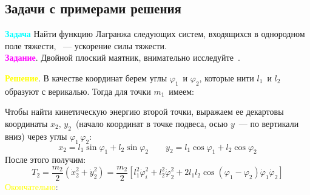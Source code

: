 \newpage	%

\subsection{Задачи с  примерами решения}
{\color{white}
\noindent
\textcolor{cyan}{\textbf{Задача}}
Найти функцию Лагранжа следующих систем, входящихся в однородном поле
тяжести, \textg\, --- ускорение силы тяжести.\\[5pt]
\noindent
\textcolor{magenta}{\textbf{Задание}}. Двойной плоский маятник,
внимательно исследуйте~.


\noindent
\textcolor{yellow}{\textbf{Решение}}. В качестве координат берем углы $\varphi_1$\, и $\varphi_2$,
которые нити $l_1$\, и $l_2$\, образуют с верикалью. Тогда для точки
$m_1$\, имеем:

\begin{center}
\end{center}

Чтобы найти кинетическую энергию второй точки, выражаем ее декартовы
координаты $x_2,\, y_2$\, (начало координат в точке подвеса, осью $y$\,
--- по вертикали вниз) через углы $\varphi_1\, \varphi_2$:
$$
x_2 = l_1 \sin \varphi_1 + l_2 \sin\varphi_2\qquad
y_2= l_1 \cos \varphi_1 + l_2 \cos \varphi_2
$$
После этого получим:
$$
T_2 = \frac{m_2}{2} \left(\dot{x}^2_2 + \dot{y}^2_2\right) =
\frac{m_2}{2}\left[
l^2_1\dot{\varphi}^2_i + l^2_2\dot{\varphi}^2_2 + 2l_1l_2\cos\left(
\varphi_1 - \varphi_2\right) \dot{\varphi}_1\dot{\varphi}_2
\right]
$$
\textcolor{yellow}{Окончательно}:\\[15pt]
\noindent
{}

}
